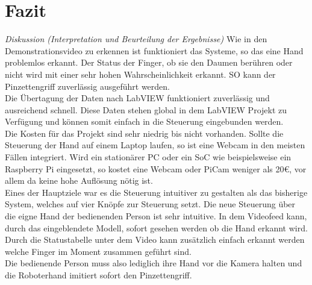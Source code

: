 \documentclass[a4paper,12pt,final]{article} %
\numberwithin{equation}{section} %
\numberwithin{figure}{section} %
\numberwithin{table}{section} %
\begin{document}
\section{Fazit}
\emph{Diskussion (Interpretation und Beurteilung der Ergebnisse)}
Wie in den Demonstrationsvideo zu erkennen ist funktioniert das Systeme, so das eine Hand problemlos erkannt.
Der Status der Finger, ob sie den Daumen berühren oder nicht wird mit einer sehr hohen Wahrscheinlichkeit erkannt.
SO kann der Pinzettengriff zuverlässig ausgeführt werden.\\
Die Übertagung der Daten nach LabVIEW funktioniert zuverlässig und ausreichend schnell.
Diese Daten stehen global in dem LabVIEW Projekt zu Verfügung und können somit einfach in die Steuerung eingebunden werden.\\
Die Kosten für das Projekt sind sehr niedrig bis nicht vorhanden. Sollte die Steuerung der Hand auf einem Laptop laufen, so ist eine Webcam in den meisten Fällen integriert.
Wird ein stationärer PC oder ein SoC wie beispielsweise ein Raspberry Pi eingesetzt, so kostet eine Webcam oder PiCam weniger als 20€, vor allem da keine hohe Auflösung nötig ist.\\
Eines der Hauptziele war es die Steuerung intuitiver zu gestalten als das bisherige System, welches auf vier Knöpfe zur Steuerung setzt. Die neue Steuerung über die eigne Hand der bedienenden Person ist sehr intuitive.
In dem Videofeed kann, durch das eingeblendete Modell, sofort gesehen werden ob die Hand erkannt wird. Durch die Statustabelle unter dem Video kann zusätzlich  einfach erkannt werden welche Finger im Moment zusammen geführt sind.\\
Die bedienende Person muss also lediglich ihre Hand vor die Kamera halten und die Roboterhand imitiert sofort den Pinzettengriff. 
\newpage
\end{document}
